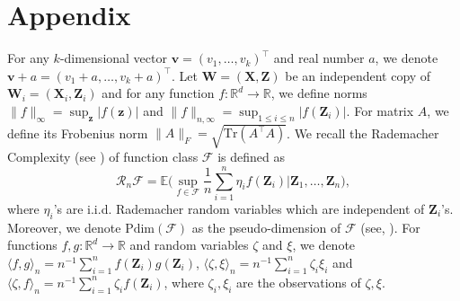\documentclass[11pt, preprint]{imsart}
\numberwithin{equation}{section}
\def \mcF{\mathcal{F}}
\def \mcRn{\mathcal{R}_n}
\def \bfX{\mathbf{X}}
\def \bfZ{\mathbf{Z}}
\def \bfz{\mathbf{z}}
\def \ev{\mathbb{E}}
\def \bfW{\mathbf{W}}
\def \bfv{\mathbf{v}}
\theoremstyle{plain}
\theoremstyle{definition}
\begin{document}

\newpage



{}

\newpage

\section*{Appendix}
\setcounter{subsection}{0}
\renewcommand{\thesubsection}{A.\arabic{subsection}}
\setcounter{subsubsection}{0}
\renewcommand{\thesubsubsection}{\textbf{A.\arabic{subsection}.\arabic{subsubsection}}}
\setcounter{equation}{0}
\renewcommand{\theequation}{A.\arabic{equation}}
\setcounter{lemma}{0}
\renewcommand{\thelemma}{A.\arabic{lemma}}
\setcounter{proposition}{0}
\renewcommand{\theproposition}{A.\arabic{proposition}}
For any $k$-dimensional vector $\bfv=(v_1,\ldots, v_k)^\top$ and real number $a$, we denote $\bfv+a=(v_1+a,\ldots, v_k+a)^\top$. Let $\bfW=(\bfX, \bfZ)$ be an independent copy of $\bfW_i=(\bfX_i, \bfZ_i)$ and for any function $f:\mathbb{R}^d \to \mathbb{R}$, we define norms $\|f\|_\infty=\sup_{\bfz}|f(\bfz)|$ and $\|f\|_{n,\infty}=\sup_{1\leq i\leq n}|f(\bfZ_i)|$. For matrix $A$, we define its Frobenius norm $\|A\|_F=\sqrt{\textrm{Tr}(A^\top A)}$. We recall the Rademacher Complexity (see \citealp{w19}) of function class $\mcF$ is defined as
\begin{equation*}
	\mcRn\mcF=\ev\bigg(\sup_{f\in \mcF}\frac{1}{n}\sum_{i=1}^n \eta_i f(\bfZ_i) \bigg| \bfZ_1,\ldots, \bfZ_n\bigg),
\end{equation*}
where $\eta_i$'s are i.i.d. Rademacher random variables which are independent of $\bfZ_i$'s. Moreover, we denote $\textrm{Pdim}(\mcF)$ as the pseudo-dimension of $\mcF$ (see, \citealp{ab09nn}). For functions $f,g: \mathbb{R}^d\to \mathbb{R}$ and random variables $\zeta$ and $\xi$, we denote $\langle f, g\rangle_n=n^{-1}\sum_{i=1}^nf(\bfZ_i)g(\bfZ_i)$,  $\langle \zeta, \xi\rangle_n=n^{-1}\sum_{i=1}^n\zeta_i\xi_i$ and $\langle \zeta, f\rangle_n=n^{-1}\sum_{i=1}^n\zeta_if(\bfZ_i)$, where $\zeta_i, \xi_i$ are the observations of $\zeta, \xi$.
\end{document}
